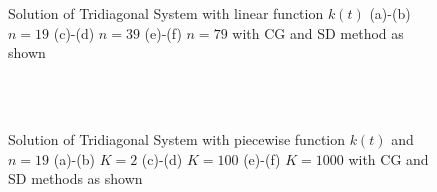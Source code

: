 \documentclass[11pt]{article}
\begin{document}
%
%
%
%
\newpage
\begin{figure}
     \centering
    		 \subfloat[][]{ \label{n_19_CG_part_a}}
     		 \subfloat[][]{ \label{n_19_SD_part_a}}
\\
    		 \subfloat[][]{ \label{n_39_CG_part_a}}
     		 \subfloat[][]{ \label{n_39_SD_part_a}}
\\
    		 \subfloat[][]{ \label{n_79_CG_part_a}}
     		 \subfloat[][]{ \label{n_79_SD_part_a}}
     \centering
     \caption{Solution of Tridiagonal System with linear function $k(t)$ (a)-(b) $n = 19$ (c)-(d) $n = 39$ (e)-(f) $n = 79$ with CG and SD method as shown}
     \label{Tradiagonal}
\end{figure}
%
%
\begin{figure}
     \centering
    		 \subfloat[][]{ \label{n_19_CG_K_2_part_b}}
     		 \subfloat[][]{ \label{n_19_SD_K_2_part_b}}
\\
    		 \subfloat[][]{ \label{n_19_CG_K_100_part_b}}
     		 \subfloat[][]{ \label{n_19_SD_K_100_part_b}}
\\
    		 \subfloat[][]{ \label{n_19_CG_K_1000_part_b}}
     		 \subfloat[][]{ \label{n_19_SD_K_1000_part_b}}
     \centering
     \caption{Solution of Tridiagonal System with piecewise function $k(t)$  and $n = 19$ (a)-(b) $K = 2$ (c)-(d) $K = 100$ (e)-(f) $K = 1000$ with CG and SD methods as shown}
     \label{Tradiagonal_linear}
\end{figure}
%
%
\end{document}
